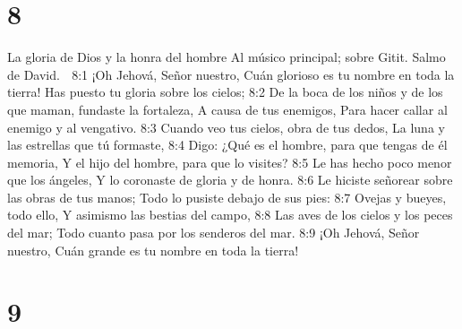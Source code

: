 \chapter{8}

La gloria de Dios y la honra del hombre 
Al músico principal; sobre Gitit. Salmo de David. 

8:1 ¡Oh Jehová, Señor nuestro, 
Cuán glorioso es tu nombre en toda la tierra! 
Has puesto tu gloria sobre los cielos; 
8:2 De la boca de los niños y de los que maman, fundaste la fortaleza, 
A causa de tus enemigos, 
Para hacer callar al enemigo y al vengativo. 
8:3 Cuando veo tus cielos, obra de tus dedos, 
La luna y las estrellas que tú formaste, 
8:4 Digo: ¿Qué es el hombre, para que tengas de él memoria, 
Y el hijo del hombre, para que lo visites? 
8:5 Le has hecho poco menor que los ángeles, 
Y lo coronaste de gloria y de honra. 
8:6 Le hiciste señorear sobre las obras de tus manos; 
Todo lo pusiste debajo de sus pies: 
8:7 Ovejas y bueyes, todo ello, 
Y asimismo las bestias del campo, 
8:8 Las aves de los cielos y los peces del mar; 
Todo cuanto pasa por los senderos del mar. 
8:9 ¡Oh Jehová, Señor nuestro, 
Cuán grande es tu nombre en toda la tierra! 

\chapter{9}

